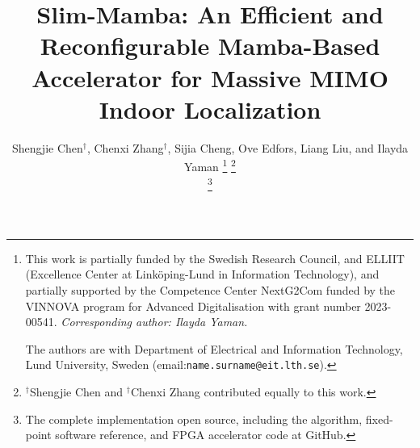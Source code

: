 \documentclass[lettersize,journal]{IEEEtran}
\begin{document}
\title{Slim-Mamba: An Efficient and Reconfigurable Mamba-Based Accelerator for Massive MIMO Indoor Localization}

\author{Shengjie Chen$^{\dagger}$, Chenxi Zhang$^{\dagger}$, Sijia Cheng, Ove Edfors, Liang Liu, and Ilayda Yaman %
\thanks{This work is partially funded by the Swedish Research Council, and ELLIIT (Excellence Center at Linköping-Lund in Information Technology), and partially supported by the Competence Center NextG2Com funded by the VINNOVA program for Advanced Digitalisation with grant number 2023-00541. \textit{Corresponding author: Ilayda Yaman.}

The authors are with Department of Electrical and Information Technology, Lund University, Sweden (email:{\tt\small name.surname@eit.lth.se}).}
 \thanks{$^{\dagger}$Shengjie Chen and $^{\dagger}$Chenxi Zhang contributed equally to this work.}
 
 \thanks{The complete implementation open source, including the algorithm, fixed-point software reference, and FPGA accelerator code at GitHub\cite{slim_mamba}.}
}%



\maketitle
\end{document}
